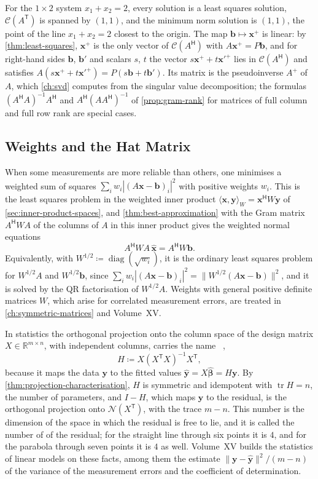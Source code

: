 For the $1\times2$ system $x_1+x_2=2$, every solution is a least squares solution, $\mathcal C(A^{\mathsf T})$ is spanned by $(1,1)$, and the minimum norm solution is $(1,1)$, the point of the line $x_1+x_2=2$ closest to the origin. The map $\mathbf b\mapsto\mathbf x^+$ is linear: by \cref{thm:least-squares}, $\mathbf x^+$ is the only vector of $\mathcal C(A^{\mathsf H})$ with $A\mathbf x^+=P\mathbf b$, and for right-hand sides $\mathbf b$, $\mathbf b'$ and scalars $s$, $t$ the vector $s\mathbf x^+ +t\mathbf x'^+$ lies in $\mathcal C(A^{\mathsf H})$ and satisfies $A(s\mathbf x^+ +t\mathbf x'^+)=P(s\mathbf b+t\mathbf b')$. Its matrix is the pseudoinverse $A^+$ of $A$, which \cref{ch:svd} computes from the singular value decomposition; the formulas $(A^{\mathsf H}A)^{-1}A^{\mathsf H}$ and $A^{\mathsf H}(AA^{\mathsf H})^{-1}$ of \cref{prop:gram-rank} for matrices of full column and full row rank are special cases.

\subsection{Weights and the Hat Matrix}

When some measurements are more reliable than others, one minimises a weighted sum of squares $\sum_iw_i|(A\mathbf x-\mathbf b)_i|^2$ with positive weights $w_i$. This is the least squares problem in the weighted inner product $\langle\mathbf x,\mathbf y\rangle_W=\mathbf x^{\mathsf H}W\mathbf y$ of \cref{sec:inner-product-spaces}, and \cref{thm:best-approximation} with the Gram matrix $A^{\mathsf H}WA$ of the columns of $A$ in this inner product gives the weighted normal equations
\[
A^{\mathsf H}WA\,\hat{\mathbf x}=A^{\mathsf H}W\mathbf b .
\]
Equivalently, with $W^{1/2}\coloneqq\operatorname{diag}(\sqrt{w_i})$, it is the ordinary least squares problem for $W^{1/2}A$ and $W^{1/2}\mathbf b$, since $\sum_iw_i|(A\mathbf x-\mathbf b)_i|^2=\|W^{1/2}(A\mathbf x-\mathbf b)\|^2$, and it is solved by the QR factorisation of $W^{1/2}A$. Weights with general positive definite matrices $W$, which arise for correlated measurement errors, are treated in \cref{ch:symmetric-matrices} and Volume~XV.

In statistics the orthogonal projection onto the column space of the design matrix $X\in\mathbb R^{m\times n}$, with independent columns, carries the name ~\cite{hoaglin1978},
\[
H\coloneqq X(X^{\mathsf T}X)^{-1}X^{\mathsf T},
\]
because it maps the data $\mathbf y$ to the fitted values $\hat{\mathbf y}=X\hat{\boldsymbol\beta}=H\mathbf y$. By \cref{thm:projection-characterisation}, $H$ is symmetric and idempotent with $\operatorname{tr}H=n$, the number of parameters, and $I-H$, which maps $\mathbf y$ to the residual, is the orthogonal projection onto $\mathcal N(X^{\mathsf T})$, with the trace $m-n$. This number is the dimension of the space in which the residual is free to lie, and it is called the number of  of the residual; for the straight line through six points it is $4$, and for the parabola through seven points it is $4$ as well. Volume~XV builds the statistics of linear models on these facts, among them the estimate $\|\mathbf y-\hat{\mathbf y}\|^2/(m-n)$ of the variance of the measurement errors and the coefficient of determination.

